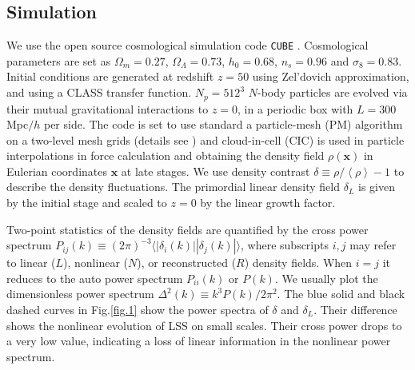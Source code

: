 \documentclass[aps,prd,twocolumn,superscriptaddress,amsfont,amssymb,amsmath,nofootinbib,showpacs,balancelastpage]{revtex4-1}
\newcommand{\bs}{\boldsymbol}
\newcommand{\lb}{\left\langle}
\newcommand{\rb}{\right\rangle}
\begin{document}
\subsection{Simulation}\label{ss.sim}
We use the open source cosmological simulation code {\tt CUBE}%
\citep{cafcube}.
Cosmological parameters are set as
$\Omega_m=0.27$, $\Omega_\Lambda=0.73$, $h_0=0.68$, $n_s=0.96$ and $\sigma_8=0.83$.
Initial conditions are generated at redshift $z=50$ 
using Zel'dovich approximation, and using a CLASS transfer function.
$N_p=512^3$ $N$-body particles are evolved via 
their mutual gravitational interactions to $z=0$, in a periodic box with $L=300$ 
Mpc$/h$ per side. The code is set to use standard a particle-mesh (PM) algorithm 
\cite{1988csup.book.....H} on a two-level mesh grids
(details see \cite{2013MNRAS.436..540H}) and cloud-in-cell
(CIC) is used in particle interpolations in force 
calculation and obtaining the density field $\rho({\bs x})$ in Eulerian coordinates 
${\bs x}$ at late stages. We use density contrast $\delta\equiv\rho/\lb\rho\rb-1$ 
to describe the density fluctuations. The primordial linear density field $
\delta_L$ is given by the initial stage and scaled to $z=0$ by the linear growth 
factor.

Two-point statistics of the density fields are quantified by the cross power 
spectrum $P_{ij}(k)\equiv(2\pi)^{-3}\langle|\delta_i(k)||\delta_j(k)|\rangle$, 
where subscripts $i,j$ may refer to linear ($L$), nonlinear ($N$), or reconstructed ($R$) density 
fields. When $i=j$ it reduces to the auto power spectrum $P_{ii}(k)$ or $P(k)$. We 
usually plot the dimensionless power spectrum $\Delta^2(k)\equiv k^3P(k)/2\pi^2$. 
The blue solid and black dashed curves in Fig.\ref{fig.1} show the power spectra of 
$\delta$ and $\delta_L$. Their difference shows the nonlinear evolution of LSS on 
small scales. Their cross power drops to a very low value, indicating a loss of 
linear information in the nonlinear power spectrum.
\end{document}
